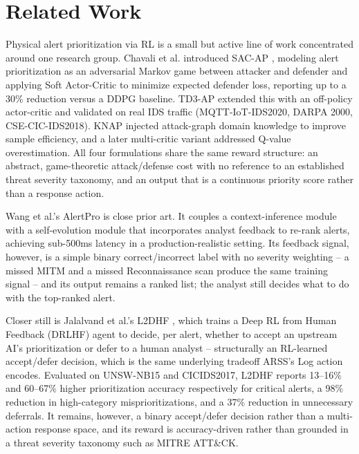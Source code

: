 \documentclass[conference]{IEEEtran}
\begin{document}
\section{Related Work}

Physical alert prioritization via RL is a small but active line of work concentrated around one research group. Chavali et al. introduced SAC-AP \cite{chavali2022}, modeling alert prioritization as an adversarial Markov game between attacker and defender and applying Soft Actor-Critic to minimize expected defender loss, reporting up to a 30\% reduction versus a DDPG baseline. TD3-AP \cite{chavali2024} extended this with an off-policy actor-critic and validated on real IDS traffic (MQTT-IoT-IDS2020, DARPA 2000, CSE-CIC-IDS2018). KNAP \cite{knap2024} injected attack-graph domain knowledge to improve sample efficiency, and a later multi-critic variant \cite{chavali2025multicrit} addressed Q-value overestimation. All four formulations share the same reward structure: an abstract, game-theoretic attack/defense cost with no reference to an established threat severity taxonomy, and an output that is a continuous priority score rather than a response action.

Wang et al.'s AlertPro \cite{alertpro2024} is close prior art. It couples a context-inference module with a self-evolution module that incorporates analyst feedback to re-rank alerts, achieving sub-500ms latency in a production-realistic setting. Its feedback signal, however, is a simple binary correct/incorrect label with no severity weighting -- a missed MITM and a missed Reconnaissance scan produce the same training signal -- and its output remains a ranked list; the analyst still decides what to do with the top-ranked alert.

Closer still is Jalalvand et al.'s L2DHF \cite{l2dhf2025}, which trains a Deep RL from Human Feedback (DRLHF) agent to decide, per alert, whether to accept an upstream AI's prioritization or defer to a human analyst -- structurally an RL-learned accept/defer decision, which is the same underlying tradeoff ARSS's Log action encodes. Evaluated on UNSW-NB15 and CICIDS2017, L2DHF reports 13--16\% and 60--67\% higher prioritization accuracy respectively for critical alerts, a 98\% reduction in high-category misprioritizations, and a 37\% reduction in unnecessary deferrals. It remains, however, a binary accept/defer decision rather than a multi-action response space, and its reward is accuracy-driven rather than grounded in a threat severity taxonomy such as MITRE ATT\&CK.
\end{document}
